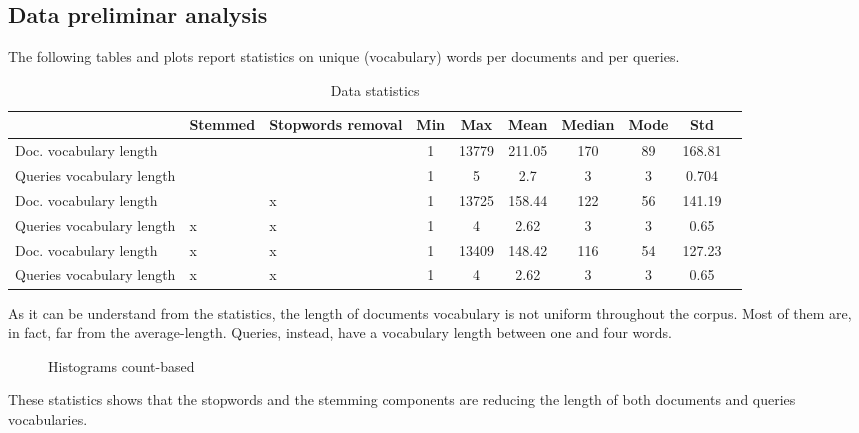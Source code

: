 \subsection{Data preliminar analysis}

The following tables and plots report statistics on unique (vocabulary) words per documents and per queries.

\begin{table}[H]
\centering
\begin{tabular}{p{2cm}p{1.5cm}p{2cm}ccccccc}
 & Stemmed & Stopwords removal & Min & Max & Mean & Median & Mode & Std \\ \hline
Doc. vocabulary length & & & 1 & 13779 & 211.05 & 170 & 89 & 168.81 \\ \hline
Queries vocabulary length & & & 1 & 5 & 2.7 & 3 & 3 & 0.704 \\ \hline
Doc. vocabulary length & & x & 1 & 13725 & 158.44 & 122 & 56 & 141.19 \\ \hline
Queries vocabulary length & x & x & 1 & 4 & 2.62 & 3 & 3 & 0.65 \\ \hline
Doc. vocabulary length & x & x & 1 & 13409 & 148.42 & 116 & 54 & 127.23 \\ \hline
Queries vocabulary length & x & x & 1 & 4 & 2.62 & 3 & 3 & 0.65 \\ \hline
\end{tabular}
\caption{Data statistics}
\label{table:DataMeasures}
\end{table}

As it can be understand from the statistics, the length of documents vocabulary is not uniform throughout the corpus. Most of them are, in fact, far from the average-length. Queries, instead, have a vocabulary length between one and four words. 

\begin{figure}[!tbp]
  \centering
  \hfill
  \caption{Histograms count-based}
  \label{fig:vocab_documents}
\end{figure}

These statistics shows that the stopwords and the stemming components are reducing the length of both documents and queries vocabularies.

